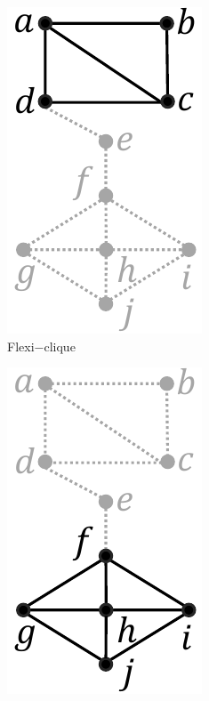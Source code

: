 \documentclass[sigconf]{acmart}
\newcommand{\flexi}{\textsf{Flexi$-$clique}}
\begin{document}
\begin{figure}[t]
\begin{subfigure}{.32\linewidth}
\includegraphics[width=0.7\linewidth]{figures/example_2.pdf}
\vspace{-0.2cm}
\caption{{\flexi}}
\label{fig:normal}
\end{subfigure}
\begin{subfigure}{.32\linewidth}
\centering
\includegraphics[width=0.7\linewidth]{figures/example_3.pdf}

\end{subfigure}
\end{figure}
\end{document}
